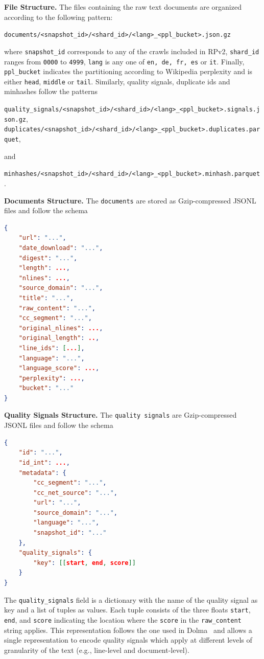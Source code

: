 \documentclass{article}
\begin{document}
{\bf File Structure.} The files containing the raw text documents are organized according to the following pattern:
\begin{center}
\small
\texttt{documents/<snapshot\_id>/<shard\_id>/<lang>\_<ppl\_bucket>.json.gz}
\end{center}
where \texttt{snapshot\_id} corresponds to any of the crawls included in RPv2, \texttt{shard\_id} ranges from \texttt{0000} to \texttt{4999}, \texttt{lang} is any one of \texttt{en, de, fr, es} or \texttt{it}. Finally, \texttt{ppl\_bucket} indicates the partitioning according to Wikipedia perplexity and is either \texttt{head}, \texttt{middle} or \texttt{tail}. Similarly, quality signals, duplicate ids and minhashes follow the patterns
\begin{center}
\small
\texttt{quality\_signals/<snapshot\_id>/<shard\_id>/<lang>\_<ppl\_bucket>.signals.json.gz},
\texttt{duplicates/<snapshot\_id>/<shard\_id>/<lang>\_<ppl\_bucket>.duplicates.parquet},
\end{center}
and
\begin{center}
\small
\texttt{minhashes/<snapshot\_id>/<shard\_id>/<lang>\_<ppl\_bucket>.minhash.parquet}.
\end{center}

{\bf Documents Structure.} The \texttt{documents} are stored as Gzip-compressed JSONL files and follow the schema
\begin{lstlisting}[language=json]
{
    "url": "...",
    "date_download": "...",
    "digest": "...",
    "length": ...,
    "nlines": ...,
    "source_domain": "...",
    "title": "...",
    "raw_content": "...",
    "cc_segment": "...",
    "original_nlines": ...,
    "original_length": ..,
    "line_ids": [...],
    "language": "...",
    "language_score": ...,
    "perplexity": ...,
    "bucket": "..."
}
\end{lstlisting}

{\bf Quality Signals Structure.} The \texttt{quality signals} are Gzip-compressed JSONL files and follow the schema
\begin{lstlisting}[language=json]
{
    "id": "...",
    "id_int": ...,
    "metadata": {
        "cc_segment": "...",
        "cc_net_source": "...",
        "url": "...",
        "source_domain": "...",
        "language": "...",
        "snapshot_id": "..."
    },
    "quality_signals": {
        "key": [[start, end, score]]
    }
}
\end{lstlisting}
The \texttt{quality\_signals} field is a dictionary with the name of the quality signal as key and a list of tuples as values. Each tuple consists of the three floats \texttt{start}, \texttt{end}, and \texttt{score} indicating the location where the \texttt{score} in the \texttt{raw\_content} string applies. This representation follows the one used in Dolma~\cite{soldaini2024dolma} and allows a single representation to encode quality signals which apply at different levels of granularity of the text (e.g., line-level and document-level).
\end{document}
